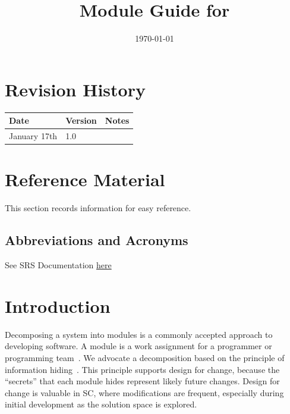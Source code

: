 \documentclass[12pt, titlepage]{article}
\begin{document}
\title{Module Guide for \progname{}} 
\author{\authname}
\date{\today}

\maketitle


\section{Revision History}

\begin{tabularx}{\textwidth}{p{3cm}p{2cm}X}
\toprule {\bf Date} & {\bf Version} & {\bf Notes}\\
\midrule
January 17th & 1.0 & \\
\bottomrule
\end{tabularx}

\newpage

\section{Reference Material}

This section records information for easy reference.

\subsection{Abbreviations and Acronyms}

See SRS Documentation \href{https://github.com/OKKM-insights/OKKM.insights/tree/main/docs/SRS}{here}

\newpage

\tableofcontents

\listoftables

\listoffigures

\newpage


\section{Introduction}

Decomposing a system into modules is a commonly accepted approach to developing
software.  A module is a work assignment for a programmer or programming
team~\citep{ParnasEtAl1984}.  We advocate a decomposition
based on the principle of information hiding~\citep{Parnas1972a}.  This
principle supports design for change, because the ``secrets'' that each module
hides represent likely future changes.  Design for change is valuable in SC,
where modifications are frequent, especially during initial development as the
solution space is explored.  
\end{document}
